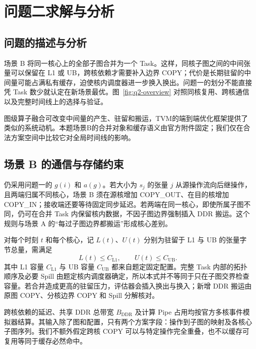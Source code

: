 \section{问题二求解与分析}
\subsection{问题的描述与分析}

场景 B 将同一核心上的全部子图合并为一个 Task。这样，同核子图之间的中间张量可以保留在 L1 或 UB，跨核依赖才需要补入边界 COPY；代价是长期驻留的中间量可能占满私有缓存，迫使核内调度器进一步换入换出。问题一的划分不能直接凭 Task 数少就认定在新场景最优。图~\ref{fig:q2-overview} 对照同核复用、跨核通信以及完整时间线上的选择与验证。



图级算子融合可改变中间量的产生、驻留和搬运，TVM的端到端优化框架提供了类似的系统动机\cite{chen2018tvm}。本题场景B的合并对象和缓存语义由官方附件固定；我们仅在合法方案空间中比较它对全局时间线的影响。

\subsection{场景 B 的通信与存储约束}

仍采用问题一的 $g(i)$ 和 $a(g)$。若大小为 $s_j$ 的张量 $j$ 从源操作流向后继操作，且两端归属不同核心，场景 B 须在源核增加 COPY\_OUT、在目的核增加 COPY\_IN；接收端还要等待固定同步延迟。若两端在同一核心，即使所属子图不同，仍可在合并 Task 内保留核内数据，不因子图边界强制插入 DDR 搬运。这个规则与场景 A 的“每过子图边界都搬运”形成核心差别。

对每个时刻 $t$ 和每个核心，记 $L(t)$、$U(t)$ 分别为驻留于 L1 与 UB 的张量字节总量，需满足
\begin{equation}\label{eq:q2-capacity}
L(t)\le C_{\mathrm{L1}},\qquad U(t)\le C_{\mathrm{UB}}.
\end{equation}
其中 L1 容量 $C_{\mathrm{L1}}$ 与 UB 容量 $C_{\mathrm{UB}}$ 都来自题定固定配置。完整 Task 内部的拓扑顺序及必要 Spill 由题定核内调度器确定，所以本式并不等同于只在子图交界检查容量。若合并造成更高的驻留压力，评估器会插入换出与换入；新增 DDR 搬运由原图 COPY、分核边界 COPY 和 Spill 分解核对。

跨核依赖的延迟、共享 DDR 总带宽 $B_{\mathrm{DDR}}$ 及计算 Pipe 占用均按官方多核事件模拟器结算。其输入除了图和配置，只有两个方案字段：操作到子图的映射及各核心子图序列。我们不额外假定跨核 COPY 可以与特定操作完全重叠，也不以缓存可复用等同于缓存必然命中。

